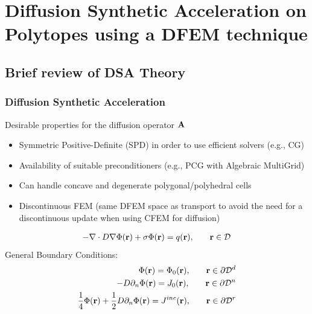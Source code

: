 \documentclass[compress,10pt]{beamer}
\begin{document}
\section[DSA on Polytopes]{Diffusion Synthetic Acceleration on Polytopes using a DFEM technique}
\subsection{Brief review of DSA Theory}
\typeout{***********************************************************************************}
\begin{frame}[t]\frametitle{Diffusion Synthetic Acceleration}

\begin{block}{Desirable properties for the diffusion operator ${\bf A}$ } {\small 
	\begin{itemize}
		\item Symmetric Positive-Definite (SPD) in order to use efficient solvers (e.g., CG)
		\item Availability of suitable preconditioners (e.g., PCG with Algebraic MultiGrid)
		\item Can handle concave and degenerate polygonal/polyhedral cells
		\item Discontinuous FEM (same DFEM space as transport to avoid the need for a discontinuous update when using CFEM for diffusion)
	\end{itemize} }
\end{block}

\begin{block}{} {\small 
     		\begin{align*}
 	 		{ \small -{\bf \nabla} \cdot D {\bf \nabla} \Phi ({\bf r}) + \sigma \Phi ({\bf r}) = q ({\bf r}), \qquad  {\bf r} \in \mathcal{D} }
        	\end{align*} 
General Boundary Conditions:
		\begin{align*}
 	 		{ \small \Phi ({\bf r})  = \Phi_0 ({\bf r}) , \qquad {\bf r} \in \partial \mathcal{D}^d } \\
 	 		{ \small -D \partial_n \Phi ({\bf r})  = J_0 ({\bf r}) , \qquad {\bf r} \in \partial \mathcal{D}^n } \\
 	 		{ \small \frac{1}{4} \Phi ({\bf r})  + \frac{1}{2}D \partial_n \Phi ({\bf r})  = J^{inc} ({\bf r}) ,  \qquad {\bf r} \in \partial \mathcal{D}^r}
        		\end{align*} } \vspace{-0.25cm}
\end{block}

\end{frame}
\end{document}
